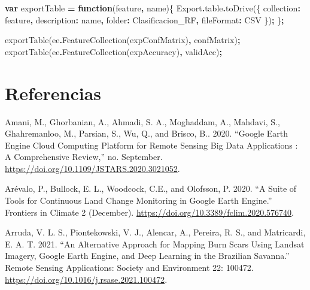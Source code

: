 \documentclass[
  12pt,
  letterpaper,
  twoside]{book}
\newenvironment{Shaded}{\begin{snugshade}}{\end{snugshade}}
\newcommand{\AttributeTok}[1]{\textcolor[rgb]{0.77,0.63,0.00}{#1}}
\newcommand{\DataTypeTok}[1]{\textcolor[rgb]{0.13,0.29,0.53}{#1}}
\newcommand{\FunctionTok}[1]{\textcolor[rgb]{0.00,0.00,0.00}{#1}}
\newcommand{\KeywordTok}[1]{\textcolor[rgb]{0.13,0.29,0.53}{\textbf{#1}}}
\newcommand{\NormalTok}[1]{#1}
\newcommand{\OperatorTok}[1]{\textcolor[rgb]{0.81,0.36,0.00}{\textbf{#1}}}
\newcommand{\StringTok}[1]{\textcolor[rgb]{0.31,0.60,0.02}{#1}}
\begin{document}
\begin{Shaded}
\begin{Highlighting}[]
\KeywordTok{var}\NormalTok{ exportTable }\OperatorTok{=} \KeywordTok{function}\NormalTok{(feature}\OperatorTok{,}\NormalTok{ name)\{}
\NormalTok{  Export}\OperatorTok{.}\AttributeTok{table}\OperatorTok{.}\FunctionTok{toDrive}\NormalTok{(\{}
    \DataTypeTok{collection}\OperatorTok{:}\NormalTok{ feature}\OperatorTok{,}
    \DataTypeTok{description}\OperatorTok{:}\NormalTok{ name}\OperatorTok{,}
    \DataTypeTok{folder}\OperatorTok{:} \StringTok{\textquotesingle{}Clasificacion\_RF\textquotesingle{}}\OperatorTok{,}
    \DataTypeTok{fileFormat}\OperatorTok{:} \StringTok{\textquotesingle{}CSV\textquotesingle{}}
\NormalTok{ \})}\OperatorTok{;}
\NormalTok{\}}\OperatorTok{;}

\FunctionTok{exportTable}\NormalTok{(ee}\OperatorTok{.}\FunctionTok{FeatureCollection}\NormalTok{(expConfMatrix)}\OperatorTok{,} \StringTok{\textquotesingle{}confMatrix\textquotesingle{}}\NormalTok{)}\OperatorTok{;}
\FunctionTok{exportTable}\NormalTok{(ee}\OperatorTok{.}\FunctionTok{FeatureCollection}\NormalTok{(expAccuracy)}\OperatorTok{,} \StringTok{\textquotesingle{}validAcc\textquotesingle{}}\NormalTok{)}\OperatorTok{;}
\end{Highlighting}
\end{Shaded}

\newpage
\backmatter

\hypertarget{referencias}{%
\chapter{Referencias}\label{referencias}}

Amani, M., Ghorbanian, A., Ahmadi, S. A., Moghaddam, A., Mahdavi, S., Ghahremanloo, M., Parsian, S., Wu, Q., and Brisco, B.. 2020. ``Google Earth Engine Cloud Computing Platform for Remote Sensing Big Data Applications : A Comprehensive Review,'' no. September. \url{https://doi.org/10.1109/JSTARS.2020.3021052}.

Arévalo, P., Bullock, E. L., Woodcock, C.E., and Olofsson, P. 2020. ``A Suite of Tools for Continuous Land Change Monitoring in Google Earth Engine.'' Frontiers in Climate 2 (December). \url{https://doi.org/10.3389/fclim.2020.576740}.

Arruda, V. L. S., Piontekowski, V. J., Alencar, A., Pereira, R. S., and Matricardi, E. A. T. 2021. ``An Alternative Approach for Mapping Burn Scars Using Landsat Imagery, Google Earth Engine, and Deep Learning in the Brazilian Savanna.'' Remote Sensing Applications: Society and Environment 22: 100472. \url{https://doi.org/10.1016/j.rsase.2021.100472}.
\end{document}
